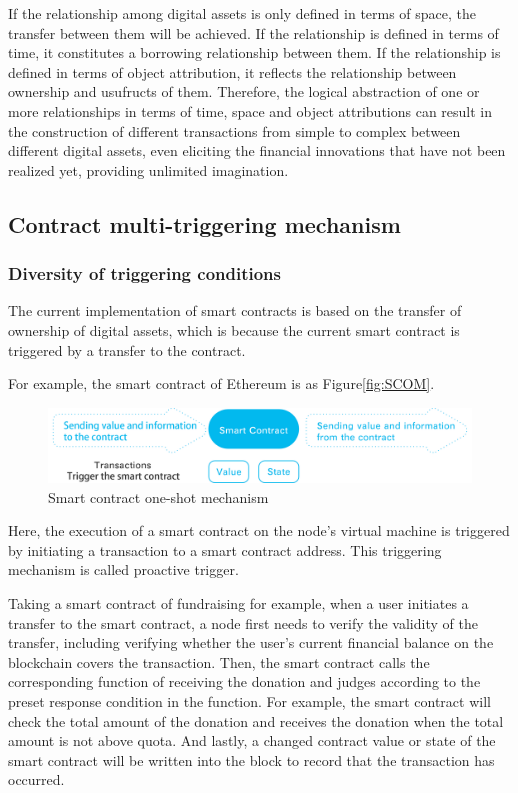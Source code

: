 \documentclass[a4paper,12pt]{article}
\begin{document}
If the relationship among digital assets is only defined in terms of space, the transfer between them will be achieved. If the relationship is defined in terms of time, it constitutes a borrowing relationship between them. If the relationship is defined in terms of object attribution, it reflects the relationship between ownership and usufructs of them. Therefore, the logical abstraction of one or more relationships in terms of time, space and object attributions can result in the construction of different transactions from simple to complex between different digital assets, even eliciting the financial innovations that have not been realized yet, providing unlimited imagination.

\subsection{Contract multi-triggering mechanism}

\subsubsection{Diversity of triggering conditions}

The current implementation of smart contracts is based on the transfer of ownership of digital assets, which is because the current smart contract is triggered by a transfer to the contract.

For example, the smart contract of Ethereum is as Figure\ref{fig:SCOM}.

\begin{figure} [htbp]
\centering \includegraphics [width = 5in]{pic/singletrigger.png}
\caption{Smart contract one-shot mechanism} \label{fig: SCOM}
\end{figure}

Here, the execution of a smart contract on the node's virtual machine is triggered by initiating a transaction to a smart contract address. This triggering mechanism is called proactive trigger.

Taking a smart contract of fundraising for example, when a user initiates a transfer to the smart contract, a node first needs to verify the validity of the transfer, including verifying whether the user's current financial balance on the blockchain covers the transaction. Then, the smart contract calls the corresponding function of receiving the donation and judges according to the preset response condition in the function. For example, the smart contract will check the total amount of the donation and receives the donation when the total amount is not above quota. And lastly, a changed contract value or state of the smart contract will be written into the block to record that the transaction has occurred.
\end{document}
